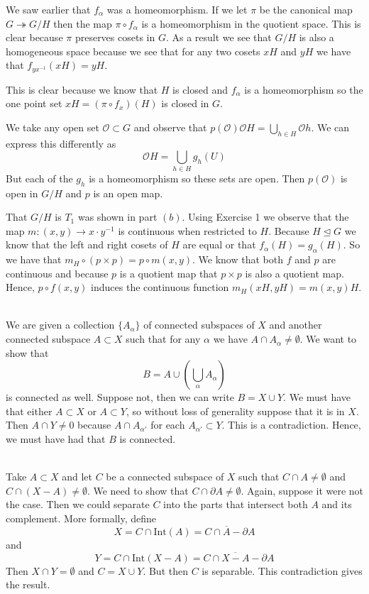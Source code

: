 \documentclass{article}
\DeclareMathOperator{\normal}{\mathrel{\unlhd}}
\DeclareMathOperator{\onto}{\twoheadrightarrow}
\newcommand{\problem}[1]{\noindent{\textbf{Problem #1}}\\}
\newcommand{\problempart}[1]{\noindent{\textbf{(#1)}}}
\begin{document}
\problempart{a} We saw earlier that $f_\alpha$ was a homeomorphism. If we let $\pi$ be the canonical map $G \onto G/H$ then the map $\pi \circ f_\alpha$ is a homeomorphism in the quotient space. This is clear because $\pi$ preserves cosets in $G$. As a result we see that $G/H$ is also a homogeneous space because we see that for any two cosets $xH$ and $yH$ we have that $f_{yx^{-1}}(xH) = yH$.

\problempart{b} This is clear because we know that $H$ is closed and $f_\alpha$ is a homeomorphism so the one point set $xH = (\pi \circ f_x) (H)$ is closed in $G$. 

\problempart{c} We take any open set $\mathcal{O} \subset G$ and observe that $p(\mathcal{O})\mathcal{O}H = \bigcup_{h \in H} \mathcal{O}h$. We can express this differently as
\[
\mathcal{O}H = \bigcup_{h\in H} g_h(U)
\]
But each of the $g_h$ is a homeomorphism so these sets are open. Then $p(\mathcal{O})$ is open in $G/H$ and $p$ is an open map. 

\problempart{d} That $G/H$ is $T_1$ was shown in part $(b)$. Using Exercise 1 we observe that the map $m: (x,y) \to x\cdot y^{-1}$ is continuous when restricted to $H$. Because $H \normal G$ we know that the left and right cosets of $H$ are equal or that $f_\alpha(H) = g_\alpha(H)$. So we have that $m_H \circ (p \times p) = p \circ m(x,y)$. We know that both $f$ and $p$ are continuous and because $p$ is a quotient map that $p \times p$ is also a quotient map. Hence, $p\circ f(x,y)$ induces the continuous function $m_H(xH,yH) = m(x,y)H$. 

\problem{3.23.3} We are given a collection $\{A_\alpha\}$ of connected subspaces of $X$ and another connected subspace $A \subset X$ such that for any $\alpha$ we have $A \cap A_\alpha \neq \emptyset$. We want to show that 
\[
B = A \cup \left(\bigcup_\alpha A_\alpha\right)
\]
is connected as well. Suppose not, then we can write $B = X \cup Y$. We must have that either $A \subset X$ or $A \subset Y$, so without loss of generality suppose that it is in $X$. Then $A \cap Y \neq 0$ because $A \cap A_{\alpha'}$ for each $A_{\alpha'} \subset Y$. This is a contradiction. Hence, we must have had that $B$ is connected. 

\problem{3.23.6} Take $A \subset X$ and let $C$ be a connected subspace of $X$ such that $C \cap A \neq \emptyset$ and $C \cap (X - A) \neq \emptyset$. We need to show that $C \cap \partial A \neq \emptyset$. Again, suppose it were not the case. Then we could separate $C$ into the parts that intersect both $A$ and its complement. More formally, define
\[
X = C \cap \text{Int}(A) = C \cap \overline{A} - \partial A
\]
and
\[
Y = C \cap \text{Int}(X-A) = C \cap \overline{X - A} - \partial A
\]
Then $X \cap Y = \emptyset$ and $C = X \cup Y$. But then $C$ is separable. This contradiction gives the result. 
\end{document}
